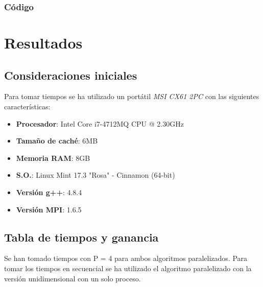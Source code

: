 \subsubsection{Código}



\section{Resultados}

\subsection{Consideraciones iniciales}

Para tomar tiempos se ha utilizado un portátil \textit{MSI CX61 2PC} con las siguientes características:
\begin{itemize}
	\item \textbf{Procesador}: Intel\textregistered{} Core\texttrademark{} i7-4712MQ CPU @ 2.30GHz
	\item \textbf{Tamaño de caché}: 6MB
	\item \textbf{Memoria RAM}: 8GB
	\item \textbf{S.O.}: Linux Mint 17.3 "Rosa" - Cinnamon (64-bit)
	\item \textbf{Versión g++}: 4.8.4
	\item \textbf{Versión MPI}: 1.6.5
\end{itemize}

\subsection{Tabla de tiempos y ganancia}

Se han tomado tiempos con P = 4 para ambos algoritmos paralelizados. Para tomar los tiempos en secuencial se ha utilizado el algoritmo paralelizado con la versión unidimensional con un solo proceso.

